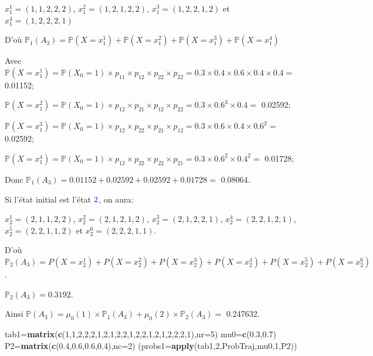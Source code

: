 \documentclass[
]{book}
\newenvironment{Shaded}{\begin{snugshade}}{\end{snugshade}}
\newcommand{\DataTypeTok}[1]{\textcolor[rgb]{0.13,0.29,0.53}{#1}}
\newcommand{\DecValTok}[1]{\textcolor[rgb]{0.00,0.00,0.81}{#1}}
\newcommand{\FloatTok}[1]{\textcolor[rgb]{0.00,0.00,0.81}{#1}}
\newcommand{\KeywordTok}[1]{\textcolor[rgb]{0.13,0.29,0.53}{\textbf{#1}}}
\newcommand{\NormalTok}[1]{#1}
\theoremstyle{definition}
\theoremstyle{definition}
\theoremstyle{definition}
\theoremstyle{remark}
\begin{document}
\(x_1^1=(1, 1, 2, 2, 2)\), \(x_1^2=(1, 2,1, 2, 2)\), \(x_1^3=(1 ,2 ,2 ,1 , 2)\) et \(x_1^4=(1 , 2, 2, 2, 1)\)

D'où \(\mathbb{P}_1(A_3)=\mathbb{P}(X=x_1^1)+\mathbb{P}(X=x_1^2)+\mathbb{P}(X=x_1^3)+\mathbb{P}(X=x_1^4)\)

Avec \(\mathbb{P}(X=x_1^1)=\mathbb{P}(X_0=1)\times p_{11}\times p_{12}\times p_{22}\times p_{22}=0.3 \times 0.4 \times 0.6 \times 0.4 \times 0.4=\) 0.01152;

\(\mathbb{P}(X=x_1^2)=\mathbb{P}(X_0=1) \times p_{12}\times p_{21}\times p_{12}\times p_{22}=0.3\times 0.6^3 \times 0.4 =\) 0.02592;

\(\mathbb{P}(X=x_1^3)=\mathbb{P}(X_0=1)\times p_{12}\times p_{22}\times p_{21}\times p_{12}=0.3\times 0.6 \times 0.4 \times 0.6^2 =\) 0.02592;

\(\mathbb{P}(X=x_1^4)=\mathbb{P}(X_0=1)\times p_{12}\times p_{22}\times p_{22}\times p_{21}=0.3\times 0.6^2 \times 0.4^2 =\) 0.01728;

Donc \(\mathbb{P}_1(A_3)= 0.01152+0.02592+0.02592+0.01728=\) 0.08064.

Si l'état initial est l'état \(\color{blue}{2}\), on aura:

\(x_2^1=(2,1, 1, 2, 2)\), \(x_2^2=(2, 1, 2, 1,2)\), \(x_2^3=(2 , 1 , 2, 2, 1)\), \(x_2^4=(2, 2, 1, 2, 1)\), \(x_2^5=(2, 2 , 1 , 1 , 2)\) et \(x_2^6=(2, 2, 2 , 1 , 1)\).

D'où \(\mathbb{P}_2(A_3)=P(X=x_2^1)+P(X=x_2^2)+P(X=x_2^3)+P(X=x_2^4)+P(X=x_2^5)+P(X=x_2^6)\).

\(\mathbb{P}_2(A_3)=0.3192\).

Ainsi \(\mathbb{P}(A_3)=\mu_0(1)\times \mathbb{P}_1(A_3)+\mu_0(2)\times \mathbb{P}_2(A_3)=\) 0.247632.

\begin{Shaded}
\begin{Highlighting}[]
\NormalTok{tab1=}\KeywordTok{matrix}\NormalTok{(}\KeywordTok{c}\NormalTok{(}\DecValTok{1}\NormalTok{,}\DecValTok{1}\NormalTok{,}\DecValTok{2}\NormalTok{,}\DecValTok{2}\NormalTok{,}\DecValTok{2}\NormalTok{,}\DecValTok{1}\NormalTok{,}\DecValTok{2}\NormalTok{,}\DecValTok{1}\NormalTok{,}\DecValTok{2}\NormalTok{,}\DecValTok{2}\NormalTok{,}\DecValTok{1}\NormalTok{,}\DecValTok{2}\NormalTok{,}\DecValTok{2}\NormalTok{,}\DecValTok{1}\NormalTok{,}\DecValTok{2}\NormalTok{,}\DecValTok{1}\NormalTok{,}\DecValTok{2}\NormalTok{,}\DecValTok{2}\NormalTok{,}\DecValTok{2}\NormalTok{,}\DecValTok{1}\NormalTok{),}\DataTypeTok{nr=}\DecValTok{5}\NormalTok{)}
\NormalTok{mu0=}\KeywordTok{c}\NormalTok{(}\FloatTok{0.3}\NormalTok{,}\FloatTok{0.7}\NormalTok{)}
\NormalTok{P2=}\KeywordTok{matrix}\NormalTok{(}\KeywordTok{c}\NormalTok{(}\FloatTok{0.4}\NormalTok{,}\FloatTok{0.6}\NormalTok{,}\FloatTok{0.6}\NormalTok{,}\FloatTok{0.4}\NormalTok{),}\DataTypeTok{nc=}\DecValTok{2}\NormalTok{)}
\NormalTok{(}\DataTypeTok{probs1=}\KeywordTok{apply}\NormalTok{(tab1,}\DecValTok{2}\NormalTok{,ProbTraj,mu0,}\DecValTok{1}\NormalTok{,P2))}
\end{Highlighting}
\end{Shaded}
\end{document}
